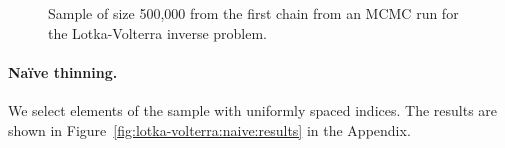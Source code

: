 \documentclass[11pt,a4paper]{report}
\begin{document}
\begin{figure}[h]
\centering
{}
\caption{Sample of size 500,000 from the first chain from an MCMC run for the Lotka-Volterra inverse problem.
\label{fig:lotka-volterra:chain1-sample}}
\end{figure}

\paragraph{Na\"ive thinning.} We select elements of the sample with uniformly spaced indices. The results are shown in Figure~\ref{fig:lotka-volterra:naive:results} in the Appendix.
\end{document}
